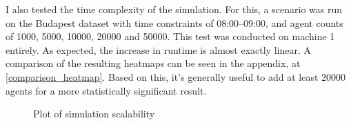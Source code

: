 \label{perftesting-heatmap}
I also tested the time complexity of the simulation. For this, a scenario was run on the Budapest dataset with time constraints of 08:00--09:00, and agent counts of 1000, 5000, 10000, 20000 and 50000. This test was conducted on machine 1 entirely. As expected, the increase in runtime is almost exactly linear. A comparison of the resulting heatmaps can be seen in the appendix, at \ref{comparison_heatmap}. Based on this, it's generally useful to add at least 20000 agents for a more statistically significant result.

\begin{figure}[h!]
    \centering
    \caption{Plot of simulation scalability}
\end{figure}